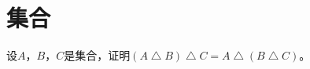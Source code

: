 \chapter{集合}
\begin{Ex}
设$A$，$B$，$C$是集合，证明$(A\bigtriangleup B)\bigtriangleup C =
A\bigtriangleup (B\bigtriangleup C)$。
\end{Ex}
